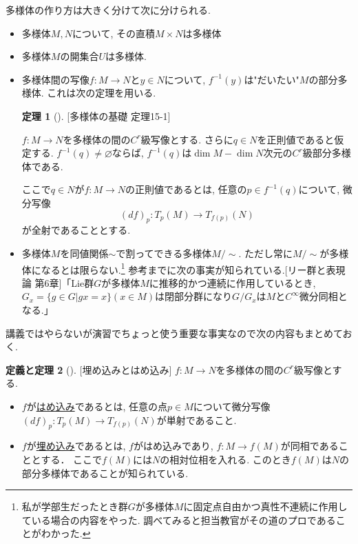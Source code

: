\documentclass[dvipdfmx,a4paper,11pt]{article}
\theoremstyle{definition}
\newtheorem{thm}{定理}
\newtheorem{dfnthm}[thm]{定義と定理}
\begin{document}
多様体の作り方は大きく分けて次に分けられる.
\begin{itemize}

\item 多様体$M,N$について, その直積$M \times N$は多様体
\item 多様体$M$の開集合$U$は多様体.
\item 多様体間の写像$f : M \rightarrow N$と$y \in N$について, $f^{-1}(y)$は"だいたい"$M$の部分多様体. 
これは次の定理を用いる.
\begin{tcolorbox}[
    colback = white,
    colframe = green!35!black,
    fonttitle = \bfseries,
    breakable = true]
    \begin{thm}[][多様体の基礎 定理15-1]
    
$f : M \rightarrow N$を多様体の間の$C^r$級写像とする. さらに$q \in N$を正則値であると仮定する. 
$f^{-1}(q) \neq \varnothing $ならば, $f^{-1}(q) $は$\dim M - \dim N$次元の$C^r$級部分多様体である.

ここで$q \in N$が$f : M \rightarrow N$の正則値であるとは, 任意の$p \in f^{-1}(q)$について,
微分写像
$$
(df)_{p} : T_{p}(M) \rightarrow T_{f(p)}(N)
$$
が全射であることとする.
    \end{thm}
    \end{tcolorbox}
\item 多様体$M$を同値関係$\sim$で割ってできる多様体$M/\sim$. ただし常に$M/\sim$が多様体になるとは限らない.\footnote{私が学部生だったとき群$G$が多様体$M$に固定点自由かつ真性不連続に作用している場合の内容をやった. 調べてみると担当教官がその道のプロであることがわかった. } 
参考までに次の事実が知られている.[リー群と表現論 第6章]「Lie群$G$が多様体$M$に推移的かつ連続に作用しているとき, $G_{x} = \{g\in G| gx =x \}(x \in M)$は閉部分群になり$G/G_{x}$は$M$と$C^{\infty}$微分同相となる.」%
\end{itemize}

講義ではやらないが演習でちょっと使う重要な事実なので次の内容もまとめておく.
\begin{tcolorbox}[
    colback = white,
    colframe = green!35!black,
    fonttitle = \bfseries,
    breakable = true]
    \begin{dfnthm}[][埋め込みとはめ込み]
    $f : M \rightarrow N$を多様体の間の$C^r$級写像とする. 
    \begin{itemize}
    \item $f$が\underline{はめ込み}であるとは, 任意の点$p \in M$について微分写像$(df)_{p} : T_{p}(M) \rightarrow T_{f(p)}(N)$が単射であること.
    \item $f$が\underline{埋め込み}であるとは, $f$がはめ込みであり, $f : M \rightarrow f(M)$が同相であることとする． ここで$f(M)$には$N$の相対位相を入れる. このとき$f(M)$は$N$の部分多様体であることが知られている. 
    \end{itemize}

    \end{dfnthm}
    \end{tcolorbox}
\newpage
\end{document}
